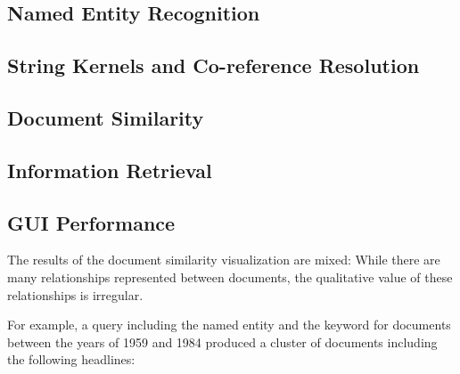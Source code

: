 
\subsection {Named Entity Recognition}
\label{sec:named_entity_recognition}


\subsection {String Kernels and Co-reference Resolution}
\label{sec:string_kernels_and_co-reference_resolution}


\subsection {Document Similarity}
\label{sec:document_similarity}

\subsection {Information Retrieval}
\label{sec:information_retrieval}

\subsection {GUI Performance}
\label{sec:gui_performance}
The results of the document similarity visualization are mixed: While there are many relationships represented between documents, the qualitative value of these relationships is irregular.

For example, a query including the named entity  and the keyword  for documents between the years of 1959 and 1984 produced a cluster of documents including the following headlines:

